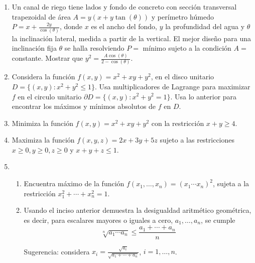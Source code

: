 \documentclass{article}
\theoremstyle{definition}
\begin{document}
\begin{enumerate}
\begin{enumerate}
          \end{enumerate}
          
        \item Un canal de riego tiene lados y fondo de concreto con
          secci\'on transversal trapezoidal de \'area $A=y(x+y\tan(\theta))$
          y per\'imetro h\'umedo $P=x+\frac{2y}{\cos(\theta)}$, donde
          $x$ es el ancho del fondo, $y$ la profundidad del agua y
          $\theta$ la inclinaci\'on lateral, medida a partir de la
          vertical. El mejor dise\~no para una inclinaci\'on
          fija $\theta$ se halla resolviendo $P=$ m\'inimo
          sujeto a la condici\'on $A=$ constante. Mostrar que
          $y^2=\frac{A\cos(\theta)}{2-\cos(\theta)}$.

        \item Considera la funci\'on $f(x,y)=x^2+xy+y^2$,
          en el disco unitario $D=\{(x,y): x^2+y^2 \leq 1\}$. Usa
          multiplicadores de Lagrange para maximizar $f$ en
          el circulo unitario  $\partial D=\{(x,y): x^2+y^2=1\}$. Usa
          lo anterior para encontrar los m\'aximos y m\'inimos absolutos
          de $f$ en $D$.
          
        \item Minimiza la funci\'on $f(x,y)=x^2+xy+y^2$ con
          la restricci\'on $x+y \geq 4$.

          
          
        \item Maximiza la funci\'on $f(x,y,z)=2x+3y+5z$ sujeto
          a las restricciones $x\geq 0, y\geq 0, z\geq 0 $ y
          $x+y+z \leq 1$.


        \item 
          \begin{enumerate}
          \item Encuentra m\'aximo de la funci\'on
            $f(x_1,\dots, x_n)=(x_1\cdots x_n)^2$, sujeta a la
            restricci\'on $x_1^2+\cdots +x_n^2=1$.
          \item Usando el inciso anterior demuestra la
            desigualdad aritm\'etico geom\'etrica, es decir,
            para escalares mayores o iguales a cero, $a_1,\dots, a_n$,
            se cumple
            $$
            \sqrt[n]{a_1\cdots a_n} \leq \frac{a_1+\cdots +a_n}{n}
            $$

            Sugerencia: considera
            $x_i=\frac{\sqrt{a_i}}{\sqrt{a_1+\cdots +a_n}}$, $i=1,\dots,n$.
          \end{enumerate}


\end{enumerate}
\end{document}
